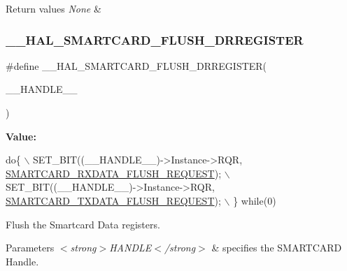 \begin{DoxyRetVals}{Return values}
{\em None} & \\
\hline
\end{DoxyRetVals}
\mbox{\label{group___s_m_a_r_t_c_a_r_d___exported___macros_ga942e652bb57d4f12e7273f4e97035ff4}} 
\subsubsection{\texorpdfstring{\+\_\+\+\_\+\+H\+A\+L\+\_\+\+S\+M\+A\+R\+T\+C\+A\+R\+D\+\_\+\+F\+L\+U\+S\+H\+\_\+\+D\+R\+R\+E\+G\+I\+S\+T\+ER}{\_\_HAL\_SMARTCARD\_FLUSH\_DRREGISTER}}
{\footnotesize\ttfamily \#define \+\_\+\+\_\+\+H\+A\+L\+\_\+\+S\+M\+A\+R\+T\+C\+A\+R\+D\+\_\+\+F\+L\+U\+S\+H\+\_\+\+D\+R\+R\+E\+G\+I\+S\+T\+ER(\begin{DoxyParamCaption}\item[{}]{\+\_\+\+\_\+\+H\+A\+N\+D\+L\+E\+\_\+\+\_\+ }\end{DoxyParamCaption})}

{\bfseries Value\+:}
\begin{DoxyCode}
\textcolor{keywordflow}{do}\{                                                                              \(\backslash\)
      SET\_BIT((\_\_HANDLE\_\_)->Instance->RQR, \hyperlink{group___s_m_a_r_t_c_a_r_d___request___parameters_ga99f5bbd7c32c09d0fc84ad4ec58bde26}{SMARTCARD\_RXDATA\_FLUSH\_REQUEST}); \(\backslash\)
      SET\_BIT((\_\_HANDLE\_\_)->Instance->RQR, \hyperlink{group___s_m_a_r_t_c_a_r_d___request___parameters_gab3fdde978ae746d718250e3c29b4e39d}{SMARTCARD\_TXDATA\_FLUSH\_REQUEST}); \(\backslash\)
      \} \textcolor{keywordflow}{while}(0)
\end{DoxyCode}


Flush the Smartcard Data registers. 


\begin{DoxyParams}{Parameters}
{\em $<$strong$>$\+H\+A\+N\+D\+L\+E$<$/strong$>$} & specifies the S\+M\+A\+R\+T\+C\+A\+RD Handle. \\
\hline
\end{DoxyParams}

